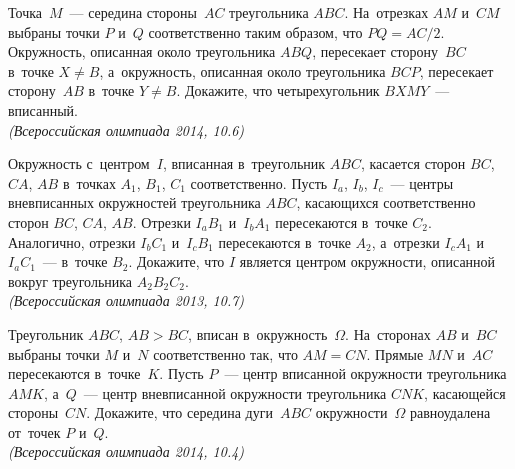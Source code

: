 \begin{problems}
\item
Точка~$M$~--- середина стороны~$AC$ треугольника $ABC$.
На~отрезках $AM$ и~$CM$ выбраны точки $P$ и~$Q$ соответственно таким образом,
что $PQ = AC / 2$.
Окружность, описанная около треугольника $ABQ$, пересекает сторону~$BC$
в~точке $X \neq B$, а~окружность, описанная около треугольника $BCP$,
пересекает сторону~$AB$ в~точке $Y \neq B$.
Докажите, что четырехугольник $BXMY$~--- вписанный.
\\\emph{(Всероссийская олимпиада 2014, 10.6)}

\item
Окружность с~центром~$I$, вписанная в~треугольник $ABC$, касается сторон
$BC$, $CA$, $AB$ в~точках $A_1$, $B_1$, $C_1$ соответственно.
Пусть $I_a$, $I_b$, $I_c$~--- центры вневписанных окружностей треугольника
$ABC$, касающихся соответственно сторон $BC$, $CA$, $AB$.
Отрезки $I_a B_1$ и~$I_b A_1$ пересекаются в~точке $C_2$.
Аналогично, отрезки $I_b C_1$ и~$I_c B_1$ пересекаются в~точке $A_2$, а~отрезки
$I_c A_1$ и~$I_a C_1$~--- в~точке $B_2$.
Докажите, что $I$ является центром окружности, описанной вокруг треугольника
$A_2 B_2 C_2$.
\\\emph{(Всероссийская олимпиада 2013, 10.7)}

\item
Треугольник $ABC$, $AB > BC$, вписан в~окружность~$\Omega$.
На~сторонах $AB$ и~$BC$ выбраны точки $M$ и~$N$ соответственно так, что
$AM = CN$.
Прямые $MN$ и~$AC$ пересекаются в~точке~$K$.
Пусть $P$~--- центр вписанной окружности треугольника $AMK$, а~$Q$~--- центр
вневписанной окружности треугольника $CNK$, касающейся стороны~$CN$.
Докажите, что середина дуги~$ABC$ окружности~$\Omega$ равноудалена
от~точек $P$ и~$Q$.
\\\emph{(Всероссийская олимпиада 2014, 10.4)}

\end{problems}


